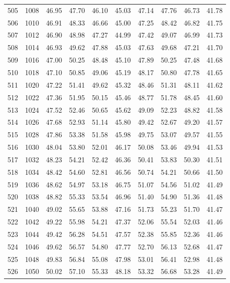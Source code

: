 \begin{longtable}{rrllllllll}
		505 & 1008 & 46.95 & 47.70 & 46.10 & 45.03 & 47.14 & 47.76 & 46.73 & 41.78 \\ 
		506 & 1010 & 46.91 & 48.33 & 46.66 & 45.00 & 47.25 & 48.42 & 46.82 & 41.75 \\ 
		507 & 1012 & 46.90 & 48.98 & 47.27 & 44.99 & 47.42 & 49.07 & 46.99 & 41.73 \\ 
		508 & 1014 & 46.93 & 49.62 & 47.88 & 45.03 & 47.63 & 49.68 & 47.21 & 41.70 \\ 
		509 & 1016 & 47.00 & 50.25 & 48.48 & 45.10 & 47.89 & 50.25 & 47.48 & 41.68 \\ 
		510 & 1018 & 47.10 & 50.85 & 49.06 & 45.19 & 48.17 & 50.80 & 47.78 & 41.65 \\ 
		511 & 1020 & 47.22 & 51.41 & 49.62 & 45.32 & 48.46 & 51.31 & 48.11 & 41.62 \\ 
		512 & 1022 & 47.36 & 51.95 & 50.15 & 45.46 & 48.77 & 51.78 & 48.45 & 41.60 \\ 
		513 & 1024 & 47.52 & 52.46 & 50.65 & 45.62 & 49.09 & 52.23 & 48.82 & 41.58 \\ 
		514 & 1026 & 47.68 & 52.93 & 51.14 & 45.80 & 49.42 & 52.67 & 49.20 & 41.57 \\ 
		515 & 1028 & 47.86 & 53.38 & 51.58 & 45.98 & 49.75 & 53.07 & 49.57 & 41.55 \\ 
		516 & 1030 & 48.04 & 53.80 & 52.01 & 46.17 & 50.08 & 53.46 & 49.94 & 41.53 \\ 
		517 & 1032 & 48.23 & 54.21 & 52.42 & 46.36 & 50.41 & 53.83 & 50.30 & 41.51 \\ 
		518 & 1034 & 48.42 & 54.60 & 52.81 & 46.56 & 50.74 & 54.21 & 50.66 & 41.50 \\ 
		519 & 1036 & 48.62 & 54.97 & 53.18 & 46.75 & 51.07 & 54.56 & 51.02 & 41.49 \\ 
		520 & 1038 & 48.82 & 55.33 & 53.54 & 46.96 & 51.40 & 54.90 & 51.36 & 41.48 \\ 
		521 & 1040 & 49.02 & 55.65 & 53.88 & 47.16 & 51.73 & 55.23 & 51.70 & 41.47 \\ 
		522 & 1042 & 49.22 & 55.98 & 54.21 & 47.37 & 52.06 & 55.54 & 52.03 & 41.46 \\ 
		523 & 1044 & 49.42 & 56.28 & 54.51 & 47.57 & 52.38 & 55.85 & 52.36 & 41.46 \\ 
		524 & 1046 & 49.62 & 56.57 & 54.80 & 47.77 & 52.70 & 56.13 & 52.68 & 41.47 \\ 
		525 & 1048 & 49.83 & 56.84 & 55.08 & 47.98 & 53.01 & 56.41 & 52.98 & 41.48 \\ 
		526 & 1050 & 50.02 & 57.10 & 55.33 & 48.18 & 53.32 & 56.68 & 53.28 & 41.49 \\ 

\end{longtable}

